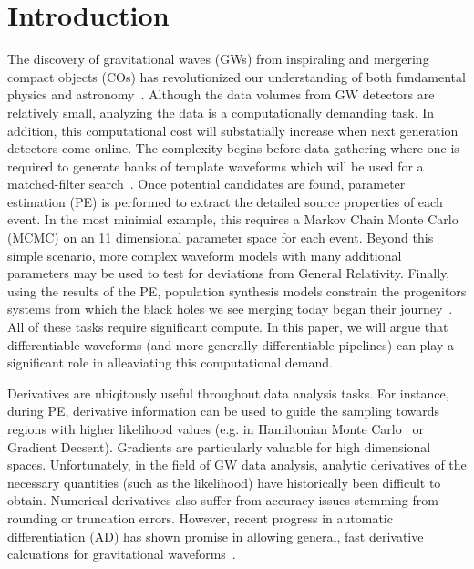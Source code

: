 \documentclass[twocolumn]{aastex631}
\begin{document}
\section{Introduction}
\label{sec:intro}


The discovery of gravitational waves (GWs) from inspiraling and mergering compact objects (COs) has revolutionized our understanding of both fundamental physics and astronomy~\citep{LIGOScientific:2021djp}.
Although the data volumes from GW detectors are relatively small, analyzing the data is a computationally demanding task.
In addition, this computational cost will substatially increase when next generation detectors come online.
The complexity begins before data gathering where one is required to generate banks of template waveforms which will be used for a matched-filter search~\citep{Owen:1998dk, Owen:1995tm}. 
Once potential candidates are found, parameter estimation (PE) is performed to extract the detailed source properties of each event.
In the most minimial example, this requires a Markov Chain Monte Carlo (MCMC) on an 11 dimensional parameter space for each event.
Beyond this simple scenario, more complex waveform models with many additional parameters may be used to test for deviations from General Relativity.
Finally, using the results of the PE, population synthesis models constrain the progenitors systems from which the black holes we see merging today began their journey~\citep{Wong:2022flg}.
All of these tasks require significant compute.
In this paper, we will argue that differentiable waveforms (and more generally differentiable pipelines) can play a significant role in alleaviating this computational demand.

Derivatives are ubiqitously useful throughout data analysis tasks.
For instance, during PE, derivative information can be used to guide the sampling towards regions with higher likelihood values (e.g. in Hamiltonian Monte Carlo~\citep{2017arXiv170102434B} or Gradient Decsent).
Gradients are particularly valuable for high dimensional spaces.
Unfortunately, in the field of GW data analysis, analytic derivatives of the necessary quantities (such as the likelihood) have historically been difficult to obtain.
Numerical derivatives also suffer from accuracy issues stemming from rounding or truncation errors.
However, recent progress in automatic differentiation (AD) has shown promise in allowing general, fast derivative calcuations for gravitational waveforms~\citep{Coogan:2022qxs}.
\end{document}
